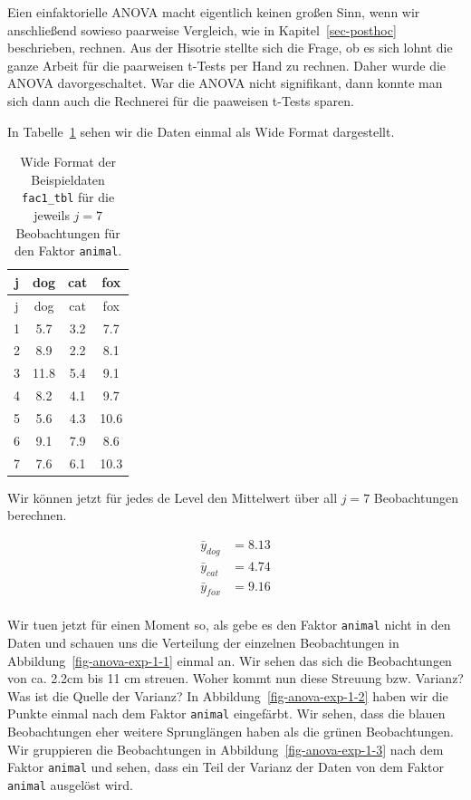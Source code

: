 \documentclass[
  letterpaper,
  DIV=11,
  oneside]{scrreport}
\begin{document}
Eien einfaktorielle ANOVA macht eigentlich keinen großen Sinn, wenn wir
anschließend sowieso paarweise Vergleich, wie in
Kapitel~\ref{sec-posthoc} beschrieben, rechnen. Aus der Hisotrie stellte
sich die Frage, ob es sich lohnt die ganze Arbeit für die paarweisen
t-Tests per Hand zu rechnen. Daher wurde die ANOVA davorgeschaltet. War
die ANOVA nicht signifikant, dann konnte man sich dann auch die
Rechnerei für die paaweisen t-Tests sparen.

In Tabelle~\ref{tbl-fac1-wide-01} sehen wir die Daten einmal als Wide
Format dargestellt.

\hypertarget{tbl-fac1-wide-01}{}
\begin{longtable}[]{@{}cccc@{}}
\caption{\label{tbl-fac1-wide-01}Wide Format der Beispieldaten
\texttt{fac1\_tbl} für die jeweils \(j=7\) Beobachtungen für den Faktor
\texttt{animal}.}\tabularnewline
\toprule()
j & dog & cat & fox \\
\midrule()
\endfirsthead
\toprule()
j & dog & cat & fox \\
\midrule()
\endhead
1 & 5.7 & 3.2 & 7.7 \\
2 & 8.9 & 2.2 & 8.1 \\
3 & 11.8 & 5.4 & 9.1 \\
4 & 8.2 & 4.1 & 9.7 \\
5 & 5.6 & 4.3 & 10.6 \\
6 & 9.1 & 7.9 & 8.6 \\
7 & 7.6 & 6.1 & 10.3 \\
\bottomrule()
\end{longtable}

Wir können jetzt für jedes de Level den Mittelwert über all \(j=7\)
Beobachtungen berechnen.

\begin{align*}
\bar{y}_{dog} &= 8.13 \\
\bar{y}_{cat} &= 4.74 \\
\bar{y}_{fox} &= 9.16 \\
\end{align*}

Wir tuen jetzt für einen Moment so, als gebe es den Faktor
\texttt{animal} nicht in den Daten und schauen uns die Verteilung der
einzelnen Beobachtungen in Abbildung~\ref{fig-anova-exp-1-1} einmal an.
Wir sehen das sich die Beobachtungen von ca. 2.2cm bis 11 cm streuen.
Woher kommt nun diese Streuung bzw. Varianz? Was ist die Quelle der
Varianz? In Abbildung~\ref{fig-anova-exp-1-2} haben wir die Punkte
einmal nach dem Faktor \texttt{animal} eingefärbt. Wir sehen, dass die
blauen Beobachtungen eher weitere Sprunglängen haben als die grünen
Beobachtungen. Wir gruppieren die Beobachtungen in
Abbildung~\ref{fig-anova-exp-1-3} nach dem Faktor \texttt{animal} und
sehen, dass ein Teil der Varianz der Daten von dem Faktor
\texttt{animal} ausgelöst wird.
\end{document}
